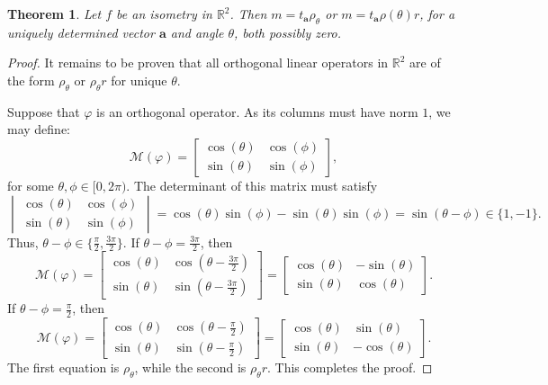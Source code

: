 \documentclass[11pt]{article}
\renewcommand{\vec}[1]{\mathbf{#1}}
\newtheorem{theorem}{Theorem}
\begin{document}
\begin{adjustwidth}{1cm}{}
	\begin{theorem}
		Let $f$ be an isometry in $\mathbb{R}^{2}$. Then $m = t_{\vec{a}} \rho_{\theta}$ or $m = t_{\vec{a}} \rho(\theta) r$, for a uniquely determined vector $\vec{a}$ and angle $\theta$, both possibly zero.
	\end{theorem}
	\begin{proof}
		It remains to be proven that all orthogonal linear operators in $\mathbb{R}^{2}$ are of the form $\rho_{\theta}$ or $\rho_{\theta} r$ for unique $\theta$. 

		Suppose that $\varphi$ is an orthogonal operator. As its columns must have norm $1$, we may define:
		\[
			\mathcal{M}(\varphi) = \begin{bmatrix} \cos(\theta) & \cos(\phi) \\ \sin(\theta) & \sin(\phi) \end{bmatrix},
		\]
		for some $\theta, \phi \in [0, 2\pi)$. The determinant of this matrix must satisfy
		\[
			\begin{vmatrix} \cos(\theta) & \cos(\phi) \\ \sin(\theta) & \sin(\phi) \end{vmatrix} = \cos(\theta)\sin(\phi) - \sin(\theta)\sin(\phi) = \sin(\theta - \phi) \in \{ 1, -1 \}.
		\]
		Thus, $\theta - \phi \in \{ \tfrac{\pi}{2}, \tfrac{3\pi}{2} \}$. If $\theta - \phi = \tfrac{3 \pi}{2}$, then
		\[
			\mathcal{M}(\varphi) = \begin{bmatrix} \cos(\theta) & \cos(\theta - \tfrac{3\pi}{2}) \\ \sin(\theta) & \sin(\theta - \tfrac{3\pi}{2}) \end{bmatrix} = \begin{bmatrix} \cos(\theta) & - \sin(\theta) \\ \sin(\theta) &  \cos(\theta) \end{bmatrix}.
		\]
		If $\theta - \phi = \tfrac{\pi}{2}$, then
		\[
			\mathcal{M}(\varphi) = \begin{bmatrix} \cos(\theta) & \cos(\theta - \tfrac{\pi}{2}) \\ \sin(\theta) & \sin(\theta - \tfrac{\pi}{2}) \end{bmatrix} = \begin{bmatrix} \cos(\theta) & \sin(\theta) \\ \sin(\theta) &  - \cos(\theta) \end{bmatrix}.
		\]
		The first equation is $\rho_{\theta}$, while the second is $\rho_{\theta} r$. This completes the proof.
	\end{proof}
\end{adjustwidth}
\end{document}
